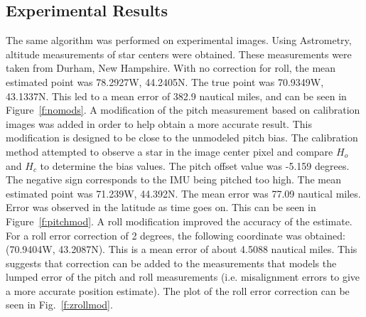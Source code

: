 \documentclass[]{aiaa-tc}%
\begin{document}
\subsection*{Experimental Results}
The same algorithm was performed on experimental images.  Using Astrometry, altitude measurements of star centers were obtained.  These measurements were taken from Durham, New Hampshire.  With no correction for roll, the mean estimated point was 78.2927W, 44.2405N.  The true point was 70.9349W, 43.1337N.  This led to a mean error of 382.9 nautical miles, and can be seen in Figure~\ref{f:nomods}.
A modification of the pitch measurement based on calibration images was added in order to help obtain a more accurate result.  This modification is designed to be close to the unmodeled pitch bias.  The calibration  method attempted to observe a star in the image center pixel and compare $H_{o}$ and $H_{c}$ to determine the bias values. The pitch offset value was -5.159 degrees. The negative sign corresponds to the IMU being pitched too high. The mean estimated point was 71.239W, 44.392N.  The mean error was 77.09 nautical miles.  Error was observed in the latitude as time goes on.  This can be seen in Figure~\ref{f:pitchmod}.
A roll modification improved the accuracy of the estimate.  For a roll error correction of 2 degrees, the following coordinate was obtained: (70.9404W, 43.2087N).  This is a mean error of about 4.5088 nautical miles.  This suggests that correction can be added to the measurements that models the lumped error of the pitch and roll measurements (i.e. misalignment errors to give a more accurate position estimate).  The plot of the roll error correction can be seen in Fig.~\ref{f:zrollmod}.


\end{document}
